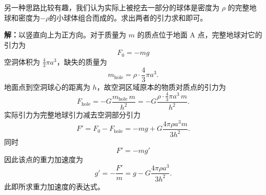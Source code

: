 另一种思路比较有趣，我们认为实际上被挖去一部分的球体是密度为 $\rho$ 的完整地球和密度为$-\rho$的小球体组合而成的。求出两者的引力求和即可。

\noindent \textbf{解：}以竖直向上为正方向。对于质量为 $m$ 的质点位于地面 A 点，完整地球对它的引力为  
\[
F_0 = -mg
\]  
空洞体积为 $\frac{4}{3}\pi a^3$，缺失的质量为  
\[
m_{\text{hole}} = \rho \cdot \frac{4}{3}\pi a^3.
\]  
地面点到空洞球心的距离为 $h$，故空洞区域原本的物质对质点的引力为  
\[
F_{\text{hole}} = -G \frac{m_{\text{hole}} \, m}{h^2} =- G \frac{\rho \cdot \frac{4}{3}\pi a^3 \, m}{h^2}.
\]  
实际引力为完整地球引力减去空洞部分引力 
\[
F' = F_0 - F_{\text{hole}} = - mg + G \frac{4\pi \rho a^3 m}{3h^2}.
\]  
同时
\[
F' = -mg'
\]
因此该点的重力加速度为  
\[
g' = - \frac{F'}{m} = g - G \frac{4\pi \rho a^3}{3h^2}.
\]  
此即所求重力加速度的表达式。
